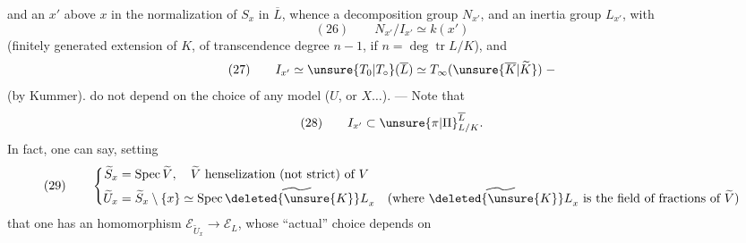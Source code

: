 and an $x'$ above $x$ in the
normalization of $S_x$ in $\overline L$, whence a
decomposition group $N_{x'}$, and an
inertia group $L_{x'}$, with
\[
(26)\qquad N_{x'}/I_{x'}\simeq k(x')
\]
(finitely generated extension of $K$, of
transcendence degree $n-1$, if $n=\deg\operatorname{tr}L/K$), and
\[
(27)\qquad I_{x'}\simeq\unsure{T_0|T_\circ}(\overline L)\simeq T_\infty(\unsure{\overline K|\widetilde K})\;-
\]
(by Kummer).  
do not depend on the choice of any
model ($U$, or $X\ldots$). --- Note that
\[
(28)\qquad I_{x'}\subset{\unsure{\pi|\Pi}}_{L/K}^{\overline L}.
\]
In fact, one can say, setting
\[
(29)\qquad\left\{\begin{aligned}
\widetilde S_x&=\operatorname{Spec}\widetilde V,\quad\widetilde V\text{ henselization (not strict) of }V\\
\widetilde U_x&=\widetilde S_x\setminus\{x\}\simeq\operatorname{Spec}\widetilde{\deleted{\unsure{K}}L}_x\quad(\text{where }\widetilde{\deleted{\unsure{K}}L}_x\text{ is the field of fractions of }\widetilde V)
\end{aligned}\right.
\]
that one has an  homomorphism $\mathcal E_{\widetilde U_x}\longrightarrow\mathcal E_L$,
 whose ``actual'' choice depends on
